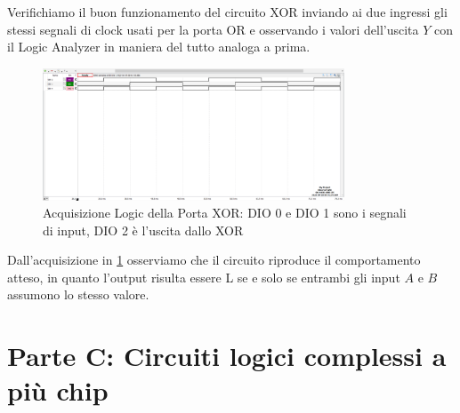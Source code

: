 \documentclass[10pt, a4paper, italian]{article}
\begin{document}
Verifichiamo il buon funzionamento del circuito XOR inviando ai due
ingressi gli stessi segnali di clock usati per la porta OR e osservando i
valori dell'uscita $Y$ con il Logic Analyzer in maniera del tutto analoga a
prima.
\begin{figure}[htbp]
    \centering
    \includegraphics[width=0.8\textwidth]{xor_time.png}
    \caption{Acquisizione Logic della Porta XOR: DIO 0 e DIO 1 sono i segnali
    di input, DIO 2 è l'uscita dallo XOR}
    \label{fig: XOR_time}
\end{figure}
Dall'acquisizione in \ref{fig: XOR_time} osserviamo che il circuito riproduce
il comportamento atteso, in quanto l'output risulta essere L se e solo se
entrambi gli input $A$ e $B$ assumono lo stesso valore.

\setcounter{section}{5}
\section*{Parte C: Circuiti logici complessi a più chip}
\end{document}
